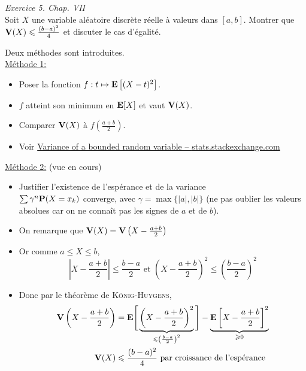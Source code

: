 \begin{exercice}    
    \emph{Exercice 5. Chap. VII}\\
    Soit $X$ une variable aléatoire discrète réelle à valeurs dans $[a, b]$. Montrer que $\V(X) \leqslant \frac{(b-a)^2}{4}$ et discuter le cas d'égalité.
\end{exercice}

\begin{solution}
    Deux méthodes sont introduites.\\
    \underline{Méthode 1:}
    \begin{itemize}
        \item Poser la fonction $f:t \mapsto \E \left[(X-t)^2 \right]$.
        \item $f$ atteint son minimum en $\E[X]$ et vaut $\V(X)$. 
        \item Comparer $\V(X)$ à $f \left( \frac{a + b}{2} \right)$.
        \item Voir \href{https://stats.stackexchange.com/questions/45588/variance-of-a-bounded-random-variable}{Variance of a bounded random variable -- \textsf{stats.stackexchange.com}}
    \end{itemize}
    
    \underline{Méthode 2:} (vue en cours)
    \begin{itemize}
        \item Justifier l'existence de l'espérance et de la variance\\
        $\sum \gamma^n \P(X=x_k)$ converge, avec $\gamma = \max \{ |a|, |b| \}$ (ne pas oublier les valeurs absolues  car on ne connaît pas les signes de $a$ et de $b$).
        \item On remarque que $\V(X) = \V \left( X - \frac{a+b}{2} \right)$
        \item Or comme $a \leqslant X \leqslant b$, $$\displaystyle \left| X - \frac{a+b}{2}\right| \leqslant \frac{b-a}{2} \text{ et } \displaystyle \left( X - \frac{a+b}{2} \right)^2 \leqslant \left(\frac{b-a}{2}\right)^2$$
        \item Donc par le théorème de \textsc{König}-\textsc{Huygens}, 
        \begin{align*}
            \V \left(X - \frac{a+b}{2} \right) &= \E \Bigg[ \underbrace{\left(X - \frac{a+b}{2} \right)^2}_{\leqslant \left( \frac{b-a}{2} \right)^2} \Bigg] - \underbrace{\E \left[X-\frac{a+b}{2} \right]^2}_{\geqslant 0} \\
            \V(X) &\leqslant \frac{(b-a)^2}{4} \text{ par croissance de l'espérance}
        \end{align*}
    \end{itemize}
    

\end{solution}
